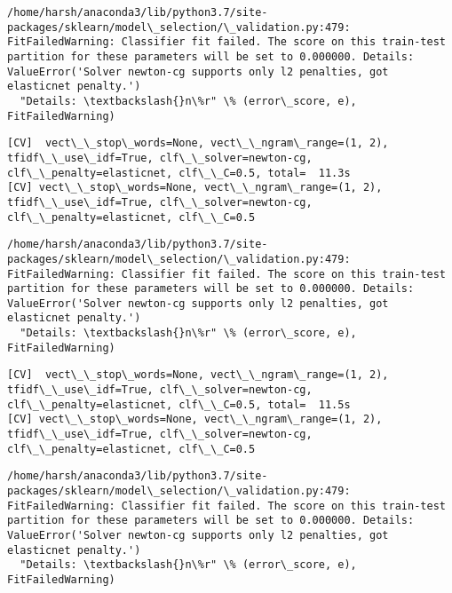 \documentclass[11pt]{article}
\begin{document}
    \begin{Verbatim}[commandchars=\\\{\}]
/home/harsh/anaconda3/lib/python3.7/site-packages/sklearn/model\_selection/\_validation.py:479: FitFailedWarning: Classifier fit failed. The score on this train-test partition for these parameters will be set to 0.000000. Details: 
ValueError('Solver newton-cg supports only l2 penalties, got elasticnet penalty.')
  "Details: \textbackslash{}n\%r" \% (error\_score, e), FitFailedWarning)

    \end{Verbatim}

    \begin{Verbatim}[commandchars=\\\{\}]
[CV]  vect\_\_stop\_words=None, vect\_\_ngram\_range=(1, 2), tfidf\_\_use\_idf=True, clf\_\_solver=newton-cg, clf\_\_penalty=elasticnet, clf\_\_C=0.5, total=  11.3s
[CV] vect\_\_stop\_words=None, vect\_\_ngram\_range=(1, 2), tfidf\_\_use\_idf=True, clf\_\_solver=newton-cg, clf\_\_penalty=elasticnet, clf\_\_C=0.5 

    \end{Verbatim}

    \begin{Verbatim}[commandchars=\\\{\}]
/home/harsh/anaconda3/lib/python3.7/site-packages/sklearn/model\_selection/\_validation.py:479: FitFailedWarning: Classifier fit failed. The score on this train-test partition for these parameters will be set to 0.000000. Details: 
ValueError('Solver newton-cg supports only l2 penalties, got elasticnet penalty.')
  "Details: \textbackslash{}n\%r" \% (error\_score, e), FitFailedWarning)

    \end{Verbatim}

    \begin{Verbatim}[commandchars=\\\{\}]
[CV]  vect\_\_stop\_words=None, vect\_\_ngram\_range=(1, 2), tfidf\_\_use\_idf=True, clf\_\_solver=newton-cg, clf\_\_penalty=elasticnet, clf\_\_C=0.5, total=  11.5s
[CV] vect\_\_stop\_words=None, vect\_\_ngram\_range=(1, 2), tfidf\_\_use\_idf=True, clf\_\_solver=newton-cg, clf\_\_penalty=elasticnet, clf\_\_C=0.5 

    \end{Verbatim}

    \begin{Verbatim}[commandchars=\\\{\}]
/home/harsh/anaconda3/lib/python3.7/site-packages/sklearn/model\_selection/\_validation.py:479: FitFailedWarning: Classifier fit failed. The score on this train-test partition for these parameters will be set to 0.000000. Details: 
ValueError('Solver newton-cg supports only l2 penalties, got elasticnet penalty.')
  "Details: \textbackslash{}n\%r" \% (error\_score, e), FitFailedWarning)

    \end{Verbatim}
\end{document}
